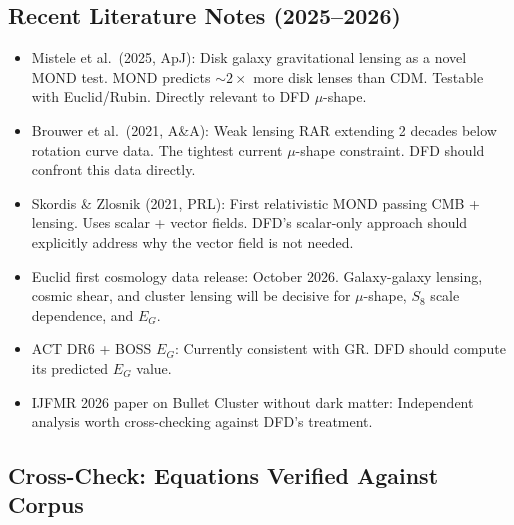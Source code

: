 \subsection*{Recent Literature Notes (2025--2026)}

\begin{itemize}
\item Mistele et al.\ (2025, ApJ):  Disk galaxy gravitational lensing
  as a novel MOND test.  MOND predicts $\sim 2\times$ more disk lenses
  than CDM.  Testable with Euclid/Rubin.  Directly relevant to
  DFD $\mu$-shape.
\item Brouwer et al.\ (2021, A\&A):  Weak lensing RAR extending 2
  decades below rotation curve data.  The tightest current $\mu$-shape
  constraint.  DFD should confront this data directly.
\item Skordis \& Zlosnik (2021, PRL):  First relativistic MOND passing
  CMB + lensing.  Uses scalar + vector fields.  DFD's scalar-only
  approach should explicitly address why the vector field is not needed.
\item Euclid first cosmology data release: October 2026.  Galaxy-galaxy
  lensing, cosmic shear, and cluster lensing will be decisive for
  $\mu$-shape, $S_8$ scale dependence, and $E_G$.
\item ACT DR6 + BOSS $E_G$: Currently consistent with GR.  DFD
  should compute its predicted $E_G$ value.
\item IJFMR 2026 paper on Bullet Cluster without dark matter:
  Independent analysis worth cross-checking against DFD's treatment.
\end{itemize}

\subsection*{Cross-Check: Equations Verified Against Corpus}

